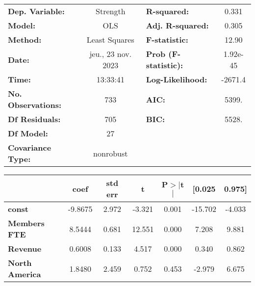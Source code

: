 \documentclass[ 11pt]{article}
\begin{document}
 \newpage
 \begin{center}
\begin{tabular}{lclc}
\toprule
\textbf{Dep. Variable:}                                &      Strength      & \textbf{  R-squared:         } &     0.331   \\
\textbf{Model:}                                        &        OLS         & \textbf{  Adj. R-squared:    } &     0.305   \\
\textbf{Method:}                                       &   Least Squares    & \textbf{  F-statistic:       } &     12.90   \\
\textbf{Date:}                                         & jeu., 23 nov. 2023 & \textbf{  Prob (F-statistic):} &  1.92e-45   \\
\textbf{Time:}                                         &      13:33:41      & \textbf{  Log-Likelihood:    } &   -2671.4   \\
\textbf{No. Observations:}                             &          733       & \textbf{  AIC:               } &     5399.   \\
\textbf{Df Residuals:}                                 &          705       & \textbf{  BIC:               } &     5528.   \\
\textbf{Df Model:}                                     &           27       & \textbf{                     } &             \\
\textbf{Covariance Type:}                              &     nonrobust      & \textbf{                     } &             \\
\bottomrule
\end{tabular}
\begin{tabular}{lcccccc}
                                                       & \textbf{coef} & \textbf{std err} & \textbf{t} & \textbf{P$> |$t$|$} & \textbf{[0.025} & \textbf{0.975]}  \\
\midrule
\textbf{const}                                         &      -9.8675  &        2.972     &    -3.321  &         0.001        &      -15.702    &       -4.033     \\
\textbf{Members FTE}                                   &       8.5444  &        0.681     &    12.551  &         0.000        &        7.208    &        9.881     \\
\textbf{Revenue}                                       &       0.6008  &        0.133     &     4.517  &         0.000        &        0.340    &        0.862     \\
\textbf{North America}                                 &       1.8480  &        2.459     &     0.752  &         0.453        &       -2.979    &        6.675     \\

\end{tabular}
\end{center}
\end{document}
